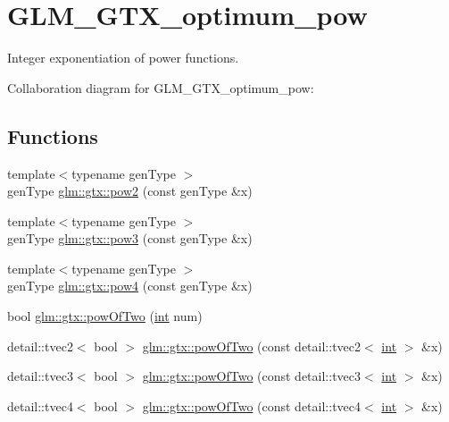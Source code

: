 \hypertarget{group__gtx__optimum__pow}{}\section{G\+L\+M\+\_\+\+G\+T\+X\+\_\+optimum\+\_\+pow}
\label{group__gtx__optimum__pow}


Integer exponentiation of power functions.  


Collaboration diagram for G\+L\+M\+\_\+\+G\+T\+X\+\_\+optimum\+\_\+pow\+:
\subsection*{Functions}
\begin{DoxyCompactItemize}
\item 
{\footnotesize template$<$typename gen\+Type $>$ }\\gen\+Type \hyperlink{group__gtx__optimum__pow_ga56697e47a1375a352a746a5be3480fc8}{glm\+::gtx\+::pow2} (const gen\+Type \&x)
\item 
{\footnotesize template$<$typename gen\+Type $>$ }\\gen\+Type \hyperlink{group__gtx__optimum__pow_gad538f8d993d8dd645c7b0c8b1cc79b09}{glm\+::gtx\+::pow3} (const gen\+Type \&x)
\item 
{\footnotesize template$<$typename gen\+Type $>$ }\\gen\+Type \hyperlink{group__gtx__optimum__pow_ga95573ae0578e980759bd329d96b13c25}{glm\+::gtx\+::pow4} (const gen\+Type \&x)
\item 
bool \hyperlink{group__gtx__optimum__pow_ga81f7bd8149b121be346894525d4d143f}{glm\+::gtx\+::pow\+Of\+Two} (\hyperlink{_s_d_l__thread_8h_a6a64f9be4433e4de6e2f2f548cf3c08e}{int} num)
\item 
detail\+::tvec2$<$ bool $>$ \hyperlink{group__gtx__optimum__pow_ga8d2eac556c39735ab92b6b1b1cfdb664}{glm\+::gtx\+::pow\+Of\+Two} (const detail\+::tvec2$<$ \hyperlink{_s_d_l__thread_8h_a6a64f9be4433e4de6e2f2f548cf3c08e}{int} $>$ \&x)
\item 
detail\+::tvec3$<$ bool $>$ \hyperlink{group__gtx__optimum__pow_ga78aa6dc57326eaf40e3d73994940b512}{glm\+::gtx\+::pow\+Of\+Two} (const detail\+::tvec3$<$ \hyperlink{_s_d_l__thread_8h_a6a64f9be4433e4de6e2f2f548cf3c08e}{int} $>$ \&x)
\item 
detail\+::tvec4$<$ bool $>$ \hyperlink{group__gtx__optimum__pow_ga6a528ec8eb6699cc72b7d3966c8bf166}{glm\+::gtx\+::pow\+Of\+Two} (const detail\+::tvec4$<$ \hyperlink{_s_d_l__thread_8h_a6a64f9be4433e4de6e2f2f548cf3c08e}{int} $>$ \&x)
\end{DoxyCompactItemize}


